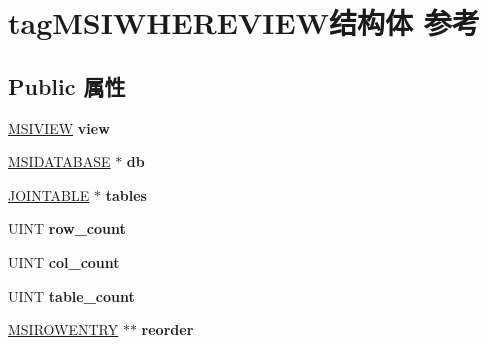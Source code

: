 \hypertarget{structtag_m_s_i_w_h_e_r_e_v_i_e_w}{}\section{tag\+M\+S\+I\+W\+H\+E\+R\+E\+V\+I\+E\+W结构体 参考}
\label{structtag_m_s_i_w_h_e_r_e_v_i_e_w}
\subsection*{Public 属性}
\begin{DoxyCompactItemize}
\item 
\mbox{\label{structtag_m_s_i_w_h_e_r_e_v_i_e_w_a604bd4dbeeaffeb86f36b2b964f8e0f6}} 
\hyperlink{structtag_m_s_i_v_i_e_w}{M\+S\+I\+V\+I\+EW} {\bfseries view}
\item 
\mbox{\label{structtag_m_s_i_w_h_e_r_e_v_i_e_w_a827b27957b473b6e765801c248eb4c85}} 
\hyperlink{structtag_m_s_i_d_a_t_a_b_a_s_e}{M\+S\+I\+D\+A\+T\+A\+B\+A\+SE} $\ast$ {\bfseries db}
\item 
\mbox{\label{structtag_m_s_i_w_h_e_r_e_v_i_e_w_a889ff3005a21e4e16f0359b4f5aef1dd}} 
\hyperlink{structtag_j_o_i_n_t_a_b_l_e}{J\+O\+I\+N\+T\+A\+B\+LE} $\ast$ {\bfseries tables}
\item 
\mbox{\label{structtag_m_s_i_w_h_e_r_e_v_i_e_w_a6a2f3be6020d2e3dceecf91535b891e9}} 
U\+I\+NT {\bfseries row\+\_\+count}
\item 
\mbox{\label{structtag_m_s_i_w_h_e_r_e_v_i_e_w_ad31b2c1ad850afaf0ce642827104c755}} 
U\+I\+NT {\bfseries col\+\_\+count}
\item 
\mbox{\label{structtag_m_s_i_w_h_e_r_e_v_i_e_w_a2564f81d83d3588b8d17119e899a48d5}} 
U\+I\+NT {\bfseries table\+\_\+count}
\item 
\mbox{\label{structtag_m_s_i_w_h_e_r_e_v_i_e_w_a692611a1e222dab5fa7d2173616eb9bc}} 
\hyperlink{structtag_m_s_i_r_o_w_e_n_t_r_y}{M\+S\+I\+R\+O\+W\+E\+N\+T\+RY} $\ast$$\ast$ {\bfseries reorder}
$$
\end{DoxyCompactItemize}
